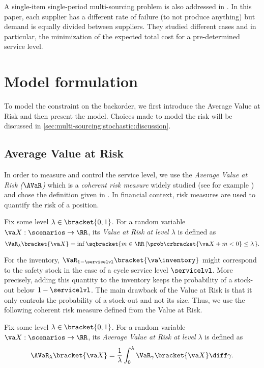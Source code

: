 A single-item single-period multi-sourcing problem is also addressed in \citet{Meena2011}.
In this paper, each supplier has a different rate of failure (\ie to not produce anything) but demand is equally divided between suppliers.
They studied different cases and in particular, the minimization of the expected total cost for a pre-determined service level.




\section{Model formulation}
\label{sec:multi-sourcing:stochastic:model-formulation}


To model the constraint on the backorder, we first introduce the Average Value at Risk and then present the model.
Choices made to model the risk will be discussed in \cref{sec:multi-sourcing:stochastic:discussion}.


\subsection{Average Value at Risk}


In order to measure and control the service level, we use the \emph{Average Value at Risk ($\AVaR$)} which is a \emph{coherent risk measure} widely studied (see for example \citet{Artzner1999,Rockafellar2000,Rockafellar2002}) and chose the definition given in \citet{Follmer2004}.
In financial context, risk measures are used to quantify the risk of a position.


Fix some level $\lambda\in\bracket{0,1}$. For a random variable $\va X:\scenarios\to\RR$, its \emph{Value at Risk at level $\lambda$} is defined as
\begin{equation}
\VaR_{\lambda}\bracket{\va X} = \inf\sqbracket{m\in\RR\left|\prob\crbracket{\va X+m<0}\le\lambda\right.}.
\end{equation}


For the inventory, $\VaR_{1-\servicelvl}\bracket{\va\inventory}$ might correspond to the safety stock in the case of a cycle service level $\servicelvl$.
More precisely, adding this quantity to the inventory keeps the probability of a stock-out below $1-\servicelvl$.
The main drawback of the Value at Risk is that it only controls the probability of a stock-out and not its size.
Thus, we use the following coherent risk measure defined from the Value at Risk.


Fix some level $\lambda\in\bracket{0,1}$. For a random variable $\va X:\scenarios\to\RR$, its \emph{Average Value at Risk at level $\lambda$} is defined as
\begin{equation}
\AVaR_{\lambda}\bracket{\va X} = \frac{1}{\lambda}\int_0^{\lambda}\VaR_{\gamma}\bracket{\va X}\diff\gamma.
\end{equation}


